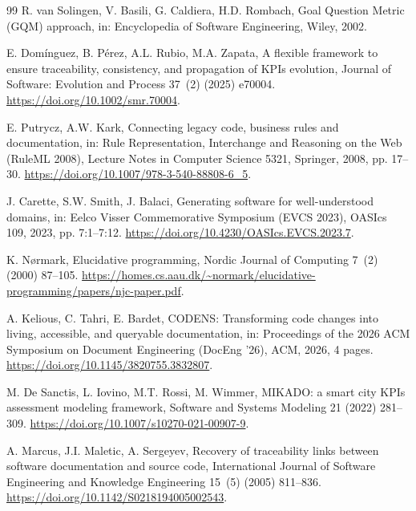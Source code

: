 \documentclass[a4paper,fleqn]{cas-dc}
\begin{document}
\begin{thebibliography}{99}
R. van Solingen, V. Basili, G. Caldiera, H.D. Rombach,
\newblock Goal Question Metric (GQM) approach,
\newblock in: Encyclopedia of Software Engineering, Wiley, 2002.

E. Dom\'inguez, B. P\'erez, A.L. Rubio, M.A. Zapata,
\newblock A flexible framework to ensure traceability, consistency, and propagation of KPIs evolution,
\newblock Journal of Software: Evolution and Process 37~(2) (2025) e70004.
\newblock \url{https://doi.org/10.1002/smr.70004}.

E. Putrycz, A.W. Kark,
\newblock Connecting legacy code, business rules and documentation,
\newblock in: Rule Representation, Interchange and Reasoning on the Web (RuleML 2008), Lecture Notes in Computer Science 5321, Springer, 2008, pp. 17--30.
\newblock \url{https://doi.org/10.1007/978-3-540-88808-6_5}.

J. Carette, S.W. Smith, J. Balaci,
\newblock Generating software for well-understood domains,
\newblock in: Eelco Visser Commemorative Symposium (EVCS 2023), OASIcs 109, 2023, pp. 7:1--7:12.
\newblock \url{https://doi.org/10.4230/OASIcs.EVCS.2023.7}.

K. N\o rmark,
\newblock Elucidative programming,
\newblock Nordic Journal of Computing 7~(2) (2000) 87--105.
\newblock \url{https://homes.cs.aau.dk/~normark/elucidative-programming/papers/njc-paper.pdf}.

A. Kelious, C. Tahri, E. Bardet,
\newblock CODENS: Transforming code changes into living, accessible, and queryable documentation,
\newblock in: Proceedings of the 2026 ACM Symposium on Document Engineering (DocEng '26), ACM, 2026, 4 pages.
\newblock \url{https://doi.org/10.1145/3820755.3832807}.

M. De Sanctis, L. Iovino, M.T. Rossi, M. Wimmer,
\newblock MIKADO: a smart city KPIs assessment modeling framework,
\newblock Software and Systems Modeling 21 (2022) 281--309.
\newblock \url{https://doi.org/10.1007/s10270-021-00907-9}.

A. Marcus, J.I. Maletic, A. Sergeyev,
\newblock Recovery of traceability links between software documentation and source code,
\newblock International Journal of Software Engineering and Knowledge Engineering 15~(5) (2005) 811--836.
\newblock \url{https://doi.org/10.1142/S0218194005002543}.


\end{thebibliography}
\end{document}
